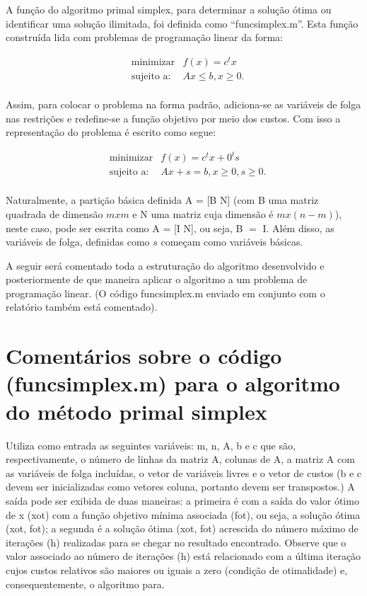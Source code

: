 \documentclass[10pt]{article}
\begin{document}
A função do algoritmo primal simplex, para determinar a solução ótima ou identificar uma solução ilimitada, foi definida como ``funcsimplex.m''. Esta função construída lida com problemas de programação linear da forma:

\begin{align*}
&\text{minimizar}& f(x) = c^{t}x\\  
&\text{sujeito a:}& Ax \le b, x \ge 0.\\
\end{align*}  

Assim, para colocar o problema na forma padrão, adiciona-se as variáveis de folga nas restrições e redefine-se a função objetivo por meio dos custos. Com isso a representação do problema é escrito como segue:

\begin{align*}
&\text{minimizar}& f(x) = c^{t}x + 0^{t}s\\  
&\text{sujeito a:}& Ax + s = b, x \ge 0, s \ge 0.\\
\end{align*}  

Naturalmente, a partição básica definida A = [B N] (com B uma matriz quadrada de dimensão $m x m$ e N uma matriz cuja dimensão é $m x (n-m)$), neste caso, pode ser escrita como A = [I N], ou seja, B $=$ I. Além disso, as variáveis de folga, definidas como $s$ começam como variáveis básicas.
\newline

A seguir será comentado toda a estruturação do algoritmo desenvolvido e posteriormente de que maneira aplicar o algoritmo a um problema de programação linear. (O código funcsimplex.m enviado em conjunto com o relatório também está comentado).


\section{Comentários sobre o código (funcsimplex.m) para o algoritmo do método primal simplex}
\newline

Utiliza como entrada as seguintes variáveis: m, n, A, b e c que são, respectivamente, o número de linhas da matriz A, colunas de A, a matriz A com as variáveis de folga incluídas, o vetor de variáveis livres e o vetor de custos (b e c devem ser inicializadas como vetores coluna, portanto devem ser transpostos.) A saída pode ser exibida de duas maneiras: a primeira é com a saída do valor ótimo de x (xot) com a função objetivo mínima associada (fot), ou seja, a solução ótima (xot, fot); a segunda é a solução ótima (xot, fot) acrescida do número máximo de iterações (h) realizadas para se chegar no resultado encontrado. Observe que o valor associado ao número de iterações (h) está relacionado com a última iteração cujos custos relativos são maiores ou iguais a zero (condição de otimalidade) e, consequentemente, o algoritmo para.
\newline
\end{document}
